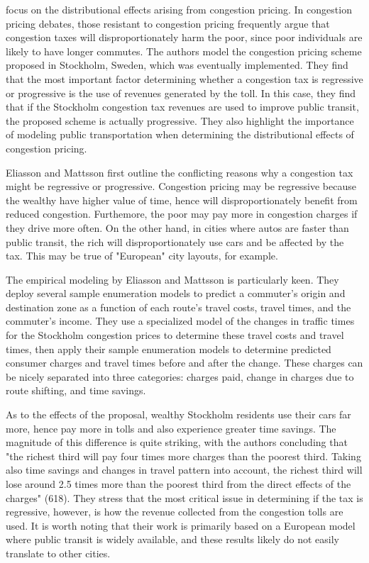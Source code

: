 \documentclass[JEL]{AEA}
\begin{document}
\cite{eliasson-2006} focus on the distributional effects arising from congestion pricing. In congestion pricing debates, those resistant to congestion pricing frequently argue that congestion taxes will disproportionately harm the poor, since poor individuals are likely to have longer commutes. The authors model the congestion pricing scheme proposed in Stockholm, Sweden, which was eventually implemented. They find that the most important factor determining whether a congestion tax is regressive or progressive is the use of revenues generated by the toll. In this case, they find that if the Stockholm congestion tax revenues are used to improve public transit, the proposed scheme is actually progressive. They also highlight the importance of modeling public transportation when determining the distributional effects of congestion pricing.

Eliasson and Mattsson first outline the conflicting reasons why a congestion tax might be regressive or progressive. Congestion pricing may be regressive because the wealthy have higher value of time, hence will disproportionately benefit from reduced congestion. Furthemore, the poor may pay more in congestion charges if they drive more often. On the other hand, in cities where autos are faster than public transit, the rich will disproportionately use cars and be affected by the tax. This may be true of "European" city layouts, for example.

The empirical modeling by Eliasson and Mattsson is particularly keen. They deploy several sample enumeration models to predict a commuter's origin and destination zone as a function of each route's travel costs, travel times, and the commuter's income. They use a specialized model of the changes in traffic times for the Stockholm congestion prices to determine these travel costs and travel times, then apply their sample enumeration models to determine predicted consumer charges and travel times before and after the change. These charges can be nicely separated into three categories: charges paid, change in charges due to route shifting, and time savings.

As to the effects of the proposal, wealthy Stockholm residents use their cars far more, hence pay more in tolls and also experience greater time savings. The magnitude of this difference is quite striking, with the authors concluding that "the richest third will pay four times more charges than the poorest third. Taking also time savings and changes in travel pattern into account, the richest third will lose around 2.5 times more than the poorest third from the direct effects of the charges" (618). They stress that the most critical issue in determining if the tax is regressive, however, is how the revenue collected from the congestion tolls are used. It is worth noting that their work is primarily based on a European model where public transit is widely available, and these results likely do not easily translate to other cities.
\end{document}
